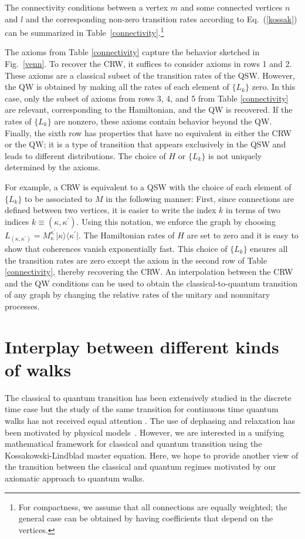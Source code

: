 \documentclass[11pt,oneside,final]{huthesis}%
\begin{document}
The connectivity conditions between a vertex $m$ and some connected
vertices $n$ and $l$ and the corresponding non-zero transition rates
according to Eq.~(\ref{kossak}) can be summarized in Table~\ref{connectivity}.\footnote{For compactness, we assume that all connections
are equally weighted; the general case can be obtained by having
coefficients that depend on the vertices.}

The axioms from Table \ref{connectivity} capture the behavior sketched
in Fig.~\ref{venn}. To recover the CRW, it suffices to consider
axioms in rows 1 and 2. These axioms are a classical subset of the
transition rates of the QSW. However, the QW is obtained by
making all the rates of each element of $\{L_k\}$ zero. In this case,
only the subset of axioms from rows 3, 4, and 5 from Table
\ref{connectivity} are relevant, corresponding to the Hamiltonian, and
the QW is recovered.  If the rates of $\{L_k\}$ are nonzero, these
axioms contain behavior beyond the QW. Finally, the sixth row has
properties that have no equivalent in either the CRW or the QW; it is
a type of transition that appears exclusively in the QSW and leads to
different distributions. The choice of $H$ or $\{L_k\}$ is not
uniquely determined by the axioms.

For example, a CRW is equivalent to a QSW with the choice of each
element of $\{L_k\}$ to be associated to $M$ in the following
manner: First, since connections are defined between two vertices, it
is easier to write the index $k$ in terms of two indices
$k\equiv(\kappa,\kappa^\prime)$. Using this notation, we enforce the graph by choosing
$L_{(\kappa,\kappa^\prime)}=M_\kappa^{\kappa^\prime}\vert \kappa
\rangle\langle \kappa^\prime\vert$. The Hamiltonian rates of $H$ are
set to zero and it is easy to show that coherences vanish exponentially fast.
This choice of $\{L_k\}$ ensures all the transition rates are zero
except the axiom in the second row of Table \ref{connectivity}, thereby recovering the
CRW.  An interpolation between the CRW and the QW conditions can be
used to obtain the classical-to-quantum transition of any graph by
changing the relative rates of the unitary and nonunitary processes.

\section{Interplay between different kinds of walks}

The classical to quantum transition has been extensively studied in the discrete time case but the study of the same transition for continuous time quantum walks has not received equal attention \cite{Kendon07}. The use of dephasing and relaxation has been motivated by physical models~\cite{Rebentrost08,Kendon03}. However, we are interested in a unifying mathematical framework for classical and quantum transition using the Kossakowski-Lindblad master equation.  Here, we hope to provide another view of the transition between the classical and quantum regimes motivated by our axiomatic approach to quantum walks.  
\end{document}
